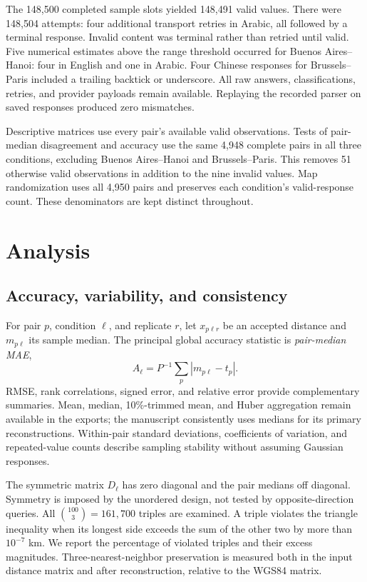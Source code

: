 \documentclass[12pt,a4paper]{article}
\begin{document}
The 148,500 completed sample slots yielded 148,491 valid values. There were 148,504 attempts: four additional transport retries in Arabic, all followed by a terminal response. Invalid content was terminal rather than retried until valid. Five numerical estimates above the range threshold occurred for Buenos Aires--Hanoi: four in English and one in Arabic. Four Chinese responses for Brussels--Paris included a trailing backtick or underscore. All raw answers, classifications, retries, and provider payloads remain available. Replaying the recorded parser on saved responses produced zero mismatches.

Descriptive matrices use every pair's available valid observations. Tests of pair-median disagreement and accuracy use the same 4,948 complete pairs in all three conditions, excluding Buenos Aires--Hanoi and Brussels--Paris. This removes 51 otherwise valid observations in addition to the nine invalid values. Map randomization uses all 4,950 pairs and preserves each condition's valid-response count. These denominators are kept distinct throughout.

\section{Analysis}
\subsection{Accuracy, variability, and consistency}
For pair $p$, condition $\ell$, and replicate $r$, let $x_{p\ell r}$ be an accepted distance and $m_{p\ell}$ its sample median. The principal global accuracy statistic is \emph{pair-median MAE},
\begin{equation}
 A_\ell=P^{-1}\sum_p |m_{p\ell}-t_p|.
\end{equation}
RMSE, rank correlations, signed error, and relative error provide complementary summaries. Mean, median, 10\%-trimmed mean, and Huber aggregation remain available in the exports; the manuscript consistently uses medians for its primary reconstructions. Within-pair standard deviations, coefficients of variation, and repeated-value counts describe sampling stability without assuming Gaussian responses.

The symmetric matrix $D_\ell$ has zero diagonal and the pair medians off diagonal. Symmetry is imposed by the unordered design, not tested by opposite-direction queries. All $\binom{100}{3}=161{,}700$ triples are examined. A triple violates the triangle inequality when its longest side exceeds the sum of the other two by more than $10^{-7}$ km. We report the percentage of violated triples and their excess magnitudes. Three-nearest-neighbor preservation is measured both in the input distance matrix and after reconstruction, relative to the WGS84 matrix.
\end{document}
